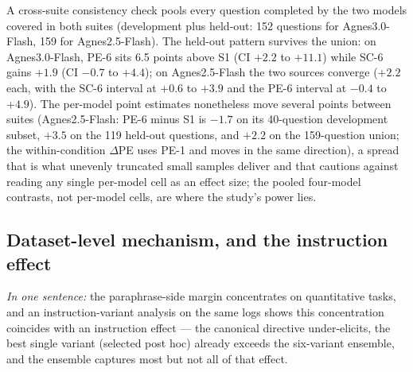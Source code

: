 \begin{table}[tbp]
\centering
\footnotesize
\caption{Expansion-set decomposition for the fully covered models: single-call accuracy of original-stem samples (S1) and paraphrase first-samples (PE-1) against the six-vote ensembles (SC-6, PE-6), with the within-condition ensembling gains ($\Delta$SC $=$ SC-6 $-$ S1, $\Delta$PE $=$ PE-6 $-$ PE-1), by dataset. Pooled rows weight questions equally.}
\label{tab:expand_ds}

\end{table}

A cross-suite consistency check pools every question completed by the two models covered in both suites (development plus held-out: 152 questions for Agnes3.0-Flash, 159 for Agnes2.5-Flash). The held-out pattern survives the union: on Agnes3.0-Flash, PE-6 sits 6.5 points above S1 (CI $+2.2$ to $+11.1$) while SC-6 gains $+1.9$ (CI $-0.7$ to $+4.4$); on Agnes2.5-Flash the two sources converge ($+2.2$ each, with the SC-6 interval at $+0.6$ to $+3.9$ and the PE-6 interval at $-0.4$ to $+4.9$). The per-model point estimates nonetheless move several points between suites (Agnes2.5-Flash: PE-6 minus S1 is $-1.7$ on its 40-question development subset, $+3.5$ on the 119 held-out questions, and $+2.2$ on the 159-question union; the within-condition $\Delta$PE uses PE-1 and moves in the same direction), a spread that is what unevenly truncated small samples deliver and that cautions against reading any single per-model cell as an effect size; the pooled four-model contrasts, not per-model cells, are where the study's power lies.

\subsection{Dataset-level mechanism, and the instruction effect}
\label{sec:heldoutmech}

\emph{In one sentence:} the paraphrase-side margin concentrates on quantitative tasks, and an instruction-variant analysis on the same logs shows this concentration coincides with an instruction effect --- the canonical directive under-elicits, the best single variant (selected post hoc) already exceeds the six-variant ensemble, and the ensemble captures most but not all of that effect.

